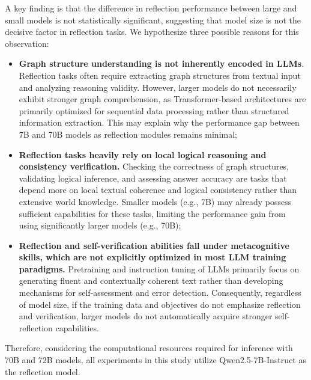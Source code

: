 \documentclass[11pt]{article}
\begin{document}
A key finding is that the difference in reflection performance between large and small models is not statistically significant, suggesting that model size is not the decisive factor in reflection tasks. We hypothesize three possible reasons for this observation:
\begin{itemize}
\item \textbf{Graph structure understanding is not inherently encoded in LLMs}. Reflection tasks often require extracting graph structures from textual input and analyzing reasoning validity. However, larger models do not necessarily exhibit stronger graph comprehension, as Transformer-based architectures are primarily optimized for sequential data processing rather than structured information extraction. This may explain why the performance gap between 7B and 70B models as reflection modules remains minimal; 

\item \textbf{Reflection tasks heavily rely on local logical reasoning and consistency verification.} Checking the correctness of graph structures, validating logical inference, and assessing answer accuracy are tasks that depend more on local textual coherence and logical consistency rather than extensive world knowledge. Smaller models (e.g., 7B) may already possess sufficient capabilities for these tasks, limiting the performance gain from using significantly larger models (e.g., 70B); 

\item \textbf{Reflection and self-verification abilities fall under metacognitive skills, which are not explicitly optimized in most LLM training paradigms.} Pretraining and instruction tuning of LLMs primarily focus on generating fluent and contextually coherent text rather than developing mechanisms for self-assessment and error detection. Consequently, regardless of model size, if the training data and objectives do not emphasize reflection and verification, larger models do not automatically acquire stronger self-reflection capabilities.
\end{itemize}
Therefore, considering the computational resources required for inference with 70B and 72B models, all experiments in this study utilize Qwen2.5-7B-Instruct as the reflection model.
\end{document}
